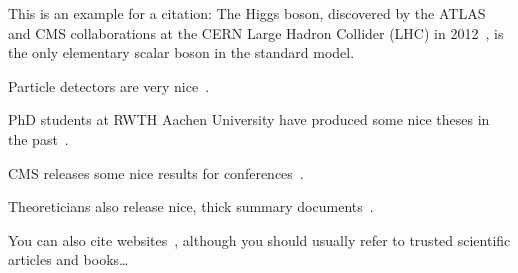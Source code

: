 \label{sec:theory}

This is an example for a citation:
The Higgs boson, discovered by the ATLAS and CMS collaborations at the CERN Large Hadron Collider (LHC) in 2012~\cite{ATLAS:2012yve,CMS:2012qbp}, is the only elementary scalar boson in the standard model.

Particle detectors are very nice~\cite{Kolanoski:2016gyf}.

PhD students at RWTH Aachen University have produced some nice theses in the past~\cite{Rieger:2019rgc}.

CMS releases some nice results for conferences~\cite{CMS-PAS-SMP-22-009}.

Theoreticians also release nice, thick summary documents~\cite{LHCHiggsCrossSectionWorkingGroup:2016ypw}.

You can also cite websites~\cite{Guardian}, although you should usually refer to trusted scientific articles and books\dots
